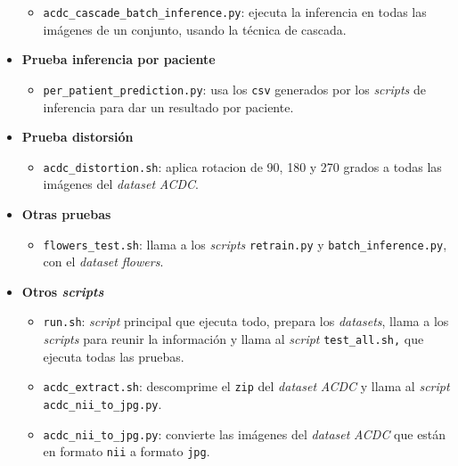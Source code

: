 \documentclass[12pt,a4paper]{article}
\begin{document}
\begin{itemize}
\begin{itemize}
\item \texttt{acdc\_cascade\_batch\_inference.py}: ejecuta la inferencia en todas las imágenes de un conjunto, usando la técnica de cascada.
\end{itemize}


\item \textbf{Prueba inferencia por paciente}

\begin{itemize}
\item \texttt{per\_patient\_prediction.py}: usa los \texttt{csv} generados por los \textit{scripts} de inferencia para dar un resultado por paciente.
\end{itemize}


\item \textbf{Prueba distorsión}

\begin{itemize}
\item \texttt{acdc\_distortion.sh}: aplica rotacion de 90, 180 y 270 grados a todas las imágenes del \textit{dataset} \textit{ACDC}.
\end{itemize}


\item \textbf{Otras pruebas}

\begin{itemize}
\item \texttt{flowers\_test.sh}: llama a los \textit{scripts} \texttt{retrain.py} y \texttt{batch\_inference.py}, con el \textit{dataset} \textit{flowers}.
\end{itemize}


\item \textbf{Otros \textit{scripts}}

\begin{itemize}
\item \texttt{run.sh}: \textit{script} principal que ejecuta todo, prepara los \textit{datasets}, llama a los \textit{scripts} para reunir la información y llama al \textit{script} \texttt{test\_all.sh,} que ejecuta todas las pruebas.

\item \texttt{acdc\_extract.sh}: descomprime el \texttt{zip} del \textit{dataset} \textit{ACDC} y llama al \textit{script} \\ \texttt{acdc\_nii\_to\_jpg.py}.

\item \texttt{acdc\_nii\_to\_jpg.py}: convierte las imágenes del \textit{dataset} \textit{ACDC} que están en formato \texttt{nii} a formato \texttt{jpg}.


\end{itemize}
\end{itemize}
\end{document}
